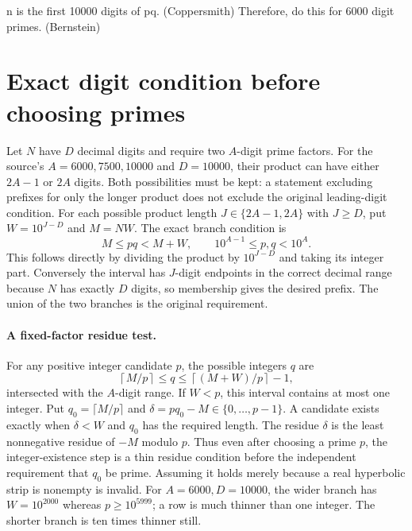 \documentclass[11pt]{article}
\begin{document}
n is the first 10000 digits of pq. (Coppersmith) Therefore, do this for 6000 digit primes. (Bernstein)

\section{Exact digit condition before choosing primes}
Let $N$ have $D$ decimal digits and require two $A$-digit prime factors.
For the source's $A=6000,7500,10000$ and $D=10000$, their product
can have either $2A-1$ or $2A$ digits. Both possibilities must be
kept: a statement excluding prefixes for only the longer product does
not exclude the original leading-digit condition.
For each possible product length $J\in\{2A-1,2A\}$ with $J\ge D$,
put $W=10^{J-D}$ and $M=NW$. The exact branch condition is
\[
M\le pq<M+W,\qquad 10^{A-1}\le p,q<10^A.
\]
This follows directly by dividing the product by $10^{J-D}$ and
taking its integer part. Conversely the interval has $J$-digit
endpoints in the correct decimal range because $N$ has exactly $D$
digits, so membership gives the desired prefix. The union of the two
branches is the original requirement.

\paragraph{A fixed-factor residue test.}
For any positive integer candidate $p$, the possible integers $q$ are
\[
\left\lceil M/p\right\rceil\le q\le
\left\lceil(M+W)/p\right\rceil-1,
\]
intersected with the $A$-digit range. If $W<p$, this interval contains
at most one integer. Put $q_0=\lceil M/p\rceil$ and
$\delta=pq_0-M\in\{0,\ldots,p-1\}$. A candidate exists exactly when
$\delta<W$ and $q_0$ has the required length. The residue $\delta$
is the least nonnegative residue of $-M$ modulo $p$.
Thus even after choosing a prime $p$, the integer-existence step is a
thin residue condition before the independent requirement that $q_0$
be prime. Assuming it holds merely because a real hyperbolic strip is
nonempty is invalid. For $A=6000,D=10000$, the wider branch has
$W=10^{2000}$ whereas $p\ge10^{5999}$; a row is much thinner than
one integer. The shorter branch is ten times thinner still.
\end{document}
